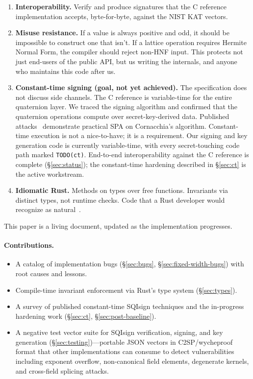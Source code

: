 \begin{enumerate}
  \item \textbf{Interoperability.}  Verify and produce signatures that
    the C reference implementation accepts, byte-for-byte, against the
    NIST KAT vectors.

  \item \textbf{Misuse resistance.}  If a value is always positive and
    odd, it should be impossible to construct one that isn't.  If a
    lattice operation requires Hermite Normal Form, the compiler should
    reject non-HNF input.  This protects not just end-users of the
    public API, but us writing the internals, and anyone who maintains
    this code after us.

  \item \textbf{Constant-time signing (goal, not yet achieved).}
    The specification does not discuss side channels.  The C reference
    is variable-time for the entire quaternion layer.  We traced the
    signing algorithm and confirmed that the quaternion operations
    compute over secret-key-derived data.  Published
    attacks~\cite{EPRINT:MCJKR25} demonstrate practical SPA on
    Cornacchia's algorithm.  Constant-time execution is not a
    nice-to-have; it is a requirement.  Our signing and key generation
    code is currently variable-time, with every secret-touching code
    path marked \texttt{TODO(ct)}.  End-to-end interoperability
    against the C reference is complete (\S\ref{sec:status}); the
    constant-time hardening described in \S\ref{sec:ct} is the
    active workstream.

  \item \textbf{Idiomatic Rust.}  Methods on types over free functions.
    Invariants via distinct types, not runtime checks.  Code that a
    Rust developer would recognize as
    natural~\cite{rust-api-guidelines}.
\end{enumerate}

This paper is a living document, updated as the implementation progresses.

\paragraph{Contributions.}
\begin{itemize}
  \item A catalog of implementation bugs (\S\ref{sec:bugs},
    \S\ref{sec:fixed-width-bugs}) with root causes and lessons.
  \item Compile-time invariant enforcement via Rust's type system
    (\S\ref{sec:types}).
  \item A survey of published constant-time SQIsign techniques and
    the in-progress hardening work
    (\S\ref{sec:ct}, \S\ref{sec:post-baseline}).
  \item A negative test vector suite for SQIsign verification,
    signing, and key generation (\S\ref{sec:testing})---portable
    JSON vectors in C2SP/wycheproof format that other implementations
    can consume to detect vulnerabilities including exponent overflow,
    non-canonical field elements, degenerate kernels, and cross-field
    splicing attacks.
\end{itemize}

